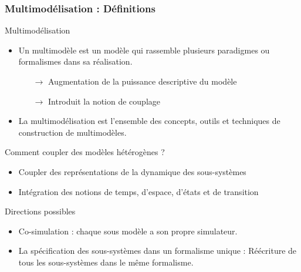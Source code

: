\documentclass[xetex, compress, table, dvipsnames]{beamer}
\begin{document}
\begin{frame}
  \frametitle{Multimodélisation : Définitions}
  \begin{alertblock}{Multimodélisation}
    \begin{itemize}
    \item Un multimodèle est un modèle qui rassemble plusieurs
      paradigmes ou formalismes dans sa réalisation.
      \begin{itemize}
      \item [$\rightarrow$] Augmentation de la puissance descriptive du modèle
      \item [$\rightarrow$] Introduit la notion de couplage
      \end{itemize}
    \item La multimodélisation est l’ensemble des concepts, outils et
      techniques de construction de multimodèles.
    \end{itemize}
  \end{alertblock}
  \begin{block}{Comment coupler des modèles hétérogènes ?}
    \begin{itemize}
    \item Coupler des représentations de la dynamique des sous-systèmes
    \item Intégration des notions de temps, d’espace, d’états et de transition
    \end{itemize}
  \end{block}
  \pause
  \begin{block}{Directions possibles}
    \begin{itemize}
    \item \alert{Co-simulation} : chaque sous modèle a son propre
      simulateur.
    \item La spécification des sous-systèmes dans un \alert{formalisme
        unique} : Réécriture de tous les sous-systèmes dans le même
      formalisme.
    \end{itemize}
  \end{block}
\end{frame}
\end{document}

